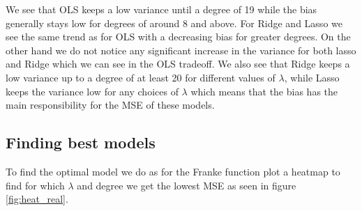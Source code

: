 \documentclass[12pt]{article}
\begin{document}
We see that OLS keeps a low variance until a degree of 19 while the bias generally stays low for degrees of around 8 and above. For Ridge and Lasso we see the same trend as for OLS with a decreasing bias for greater degrees. On the other hand we do not notice any significant increase in the variance for both lasso and Ridge which we can see in the OLS tradeoff. We also see that Ridge keeps a low variance up to a degree of at least 20 for different values of $\lambda$, while Lasso keeps the variance low for any choices of $\lambda$ which means that the bias has the main responsibility for the MSE of these models.

\subsection{Finding best models}
To find the optimal model we do as for the Franke function plot a heatmap to find for which $\lambda$ and degree we get the lowest MSE as seen in figure \ref{fig:heat_real}.
\end{document}
